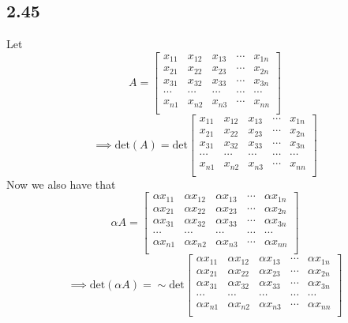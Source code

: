 \documentclass[letterpaper,12pt]{article}
\theoremstyle{definition}
\begin{document}
\subsection*{2.45}
Let 
\[ A = 
\begin{bmatrix}
    x_{11} & x_{12} & x_{13} & \cdots & x_{1n} \\
    x_{21} & x_{22} & x_{23} & \cdots & x_{2n} \\
    x_{31} & x_{32} & x_{33} & \cdots & x_{3n} \\
    \cdots&\cdots&\cdots &\cdots &\cdots\\
    x_{n1} & x_{n2} & x_{n3} & \cdots & x_{nn} \\
\end{bmatrix}
\]
\[\implies \text{det}(A)  = 
\text{det}
\begin{bmatrix}
    x_{11} & x_{12} & x_{13} & \cdots & x_{1n} \\
    x_{21} & x_{22} & x_{23} & \cdots & x_{2n} \\
    x_{31} & x_{32} & x_{33} & \cdots & x_{3n} \\
    \cdots&\cdots&\cdots &\cdots &\cdots\\
    x_{n1} & x_{n2} & x_{n3} & \cdots & x_{nn} \\
\end{bmatrix}
\]
Now we also have that
\[ \alpha A = 
\begin{bmatrix}
    \alpha x_{11} &\alpha x_{12} &\alpha x_{13} & \cdots &\alpha x_{1n} \\
   \alpha x_{21} &\alpha x_{22} &\alpha x_{23} & \cdots &\alpha x_{2n} \\
   \alpha x_{31} &\alpha x_{32} &\alpha x_{33} & \cdots &\alpha x_{3n} \\
    \cdots&\cdots&\cdots &\cdots &\cdots\\
   \alpha x_{n1} &\alpha x_{n2} &\alpha x_{n3} & \cdots &\alpha x_{nn} \\
\end{bmatrix}
\]
\[\implies \text{det}( \alpha A) = 
\sim
\text{det}
\begin{bmatrix}
    \alpha x_{11} &\alpha x_{12} &\alpha x_{13} & \cdots &\alpha x_{1n} \\
   \alpha x_{21} &\alpha x_{22} &\alpha x_{23} & \cdots &\alpha x_{2n} \\
   \alpha x_{31} &\alpha x_{32} &\alpha x_{33} & \cdots &\alpha x_{3n} \\
    \cdots&\cdots&\cdots &\cdots &\cdots\\
   \alpha x_{n1} &\alpha x_{n2} &\alpha x_{n3} & \cdots &\alpha x_{nn} \\
\end{bmatrix}
\]
\end{document}
